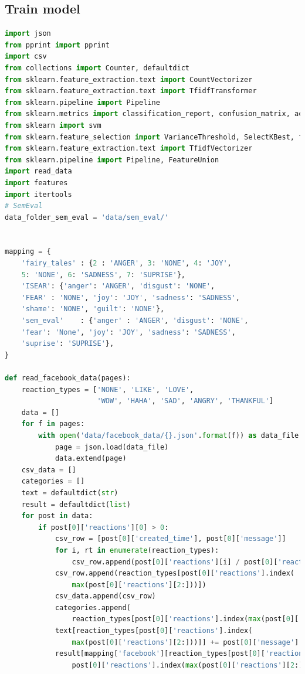 \documentclass[11pt]{article}
\begin{document}
\subsection{Train model}
\begin{lstlisting}[language=Python]
import json
from pprint import pprint
import csv
from collections import Counter, defaultdict
from sklearn.feature_extraction.text import CountVectorizer
from sklearn.feature_extraction.text import TfidfTransformer
from sklearn.pipeline import Pipeline
from sklearn.metrics import classification_report, confusion_matrix, accuracy_score,f1_score
from sklearn import svm
from sklearn.feature_selection import VarianceThreshold, SelectKBest, f_classif
from sklearn.feature_extraction.text import TfidfVectorizer
from sklearn.pipeline import Pipeline, FeatureUnion
import read_data
import features
import itertools
# SemEval
data_folder_sem_eval = 'data/sem_eval/'


mapping = {
    'fairy_tales' : {2 : 'ANGER', 3: 'NONE', 4: 'JOY', 
    5: 'NONE', 6: 'SADNESS', 7: 'SUPRISE'},
    'ISEAR': {'anger': 'ANGER', 'disgust': 'NONE', 
    'FEAR' : 'NONE', 'joy': 'JOY', 'sadness': 'SADNESS',
    'shame': 'NONE', 'guilt': 'NONE'},
    'sem_eval'    : {'anger' : 'ANGER', 'disgust': 'NONE',
    'fear': 'None', 'joy': 'JOY', 'sadness': 'SADNESS',
    'suprise': 'SUPRISE'},
}

def read_facebook_data(pages):
    reaction_types = ['NONE', 'LIKE', 'LOVE',
                      'WOW', 'HAHA', 'SAD', 'ANGRY', 'THANKFUL']
    data = []
    for f in pages:
        with open('data/facebook_data/{}.json'.format(f)) as data_file:
            page = json.load(data_file)
            data.extend(page)
    csv_data = []
    categories = []
    text = defaultdict(str)
    result = defaultdict(list)
    for post in data:
        if post[0]['reactions'][0] > 0:
            csv_row = [post[0]['created_time'], post[0]['message']]
            for i, rt in enumerate(reaction_types):
                csv_row.append(post[0]['reactions'][i] / post[0]['reactions'][0])
            csv_row.append(reaction_types[post[0]['reactions'].index(
                max(post[0]['reactions'][2:]))])
            csv_data.append(csv_row)
            categories.append(
                reaction_types[post[0]['reactions'].index(max(post[0]['reactions'][2:]))])
            text[reaction_types[post[0]['reactions'].index(
                max(post[0]['reactions'][2:]))]] += post[0]['message']
            result[mapping['facebook'][reaction_types[post[0]['reactions'].index(max(post[0]['reactions'][2:]))]]].append((mapping['facebook'][reaction_types[
                post[0]['reactions'].index(max(post[0]['reactions'][2:]))]], post[0]['message'], max(post[0]['reactions'][2:]) / post[0]['reactions'][0]))


\end{lstlisting}
\end{document}
